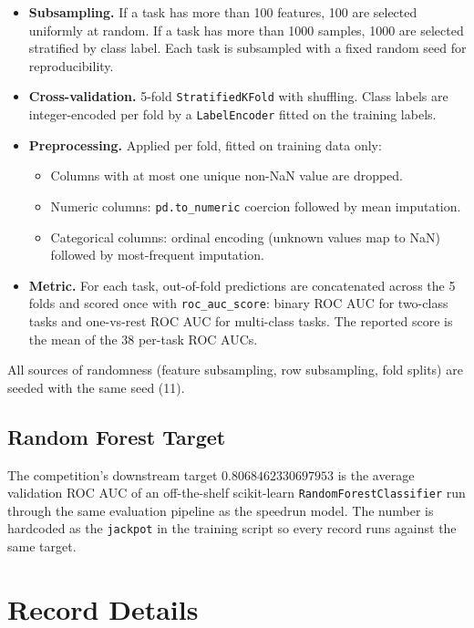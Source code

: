 \documentclass{article}
\theoremstyle{plain}
\theoremstyle{definition}
\theoremstyle{remark}
\begin{document}
\begin{itemize}
  \item \textbf{Subsampling.} If a task has more than 100 features, 100 are selected uniformly at random. If a task has more than 1000 samples, 1000 are selected stratified by class label. Each task is subsampled with a fixed random seed for reproducibility.
  \item \textbf{Cross-validation.} 5-fold \texttt{StratifiedKFold} with shuffling. Class labels are integer-encoded per fold by a \texttt{LabelEncoder} fitted on the training labels.
  \item \textbf{Preprocessing.} Applied per fold, fitted on training data only:
    \begin{itemize}
      \item Columns with at most one unique non-NaN value are dropped.
      \item Numeric columns: \texttt{pd.to\_numeric} coercion followed by mean imputation.
      \item Categorical columns: ordinal encoding (unknown values map to NaN) followed by most-frequent imputation.
    \end{itemize}
  \item \textbf{Metric.} For each task, out-of-fold predictions are concatenated across the 5 folds and scored once with \texttt{roc\_auc\_score}: binary ROC AUC for two-class tasks and one-vs-rest ROC AUC for multi-class tasks. The reported score is the mean of the 38 per-task ROC AUCs.
\end{itemize}
All sources of randomness (feature subsampling, row subsampling, fold splits) are seeded with the same seed (11).

\subsection{Random Forest Target}
\label{app:rf-target}
The competition's downstream target $0.8068462330697953$ is the average validation ROC AUC of an off-the-shelf scikit-learn \texttt{RandomForestClassifier} run through the same evaluation pipeline as the speedrun model.
The number is hardcoded as the \texttt{jackpot} in the training script so every record runs against the same target.

\section{Record Details}
\label{app:records}
\end{document}
